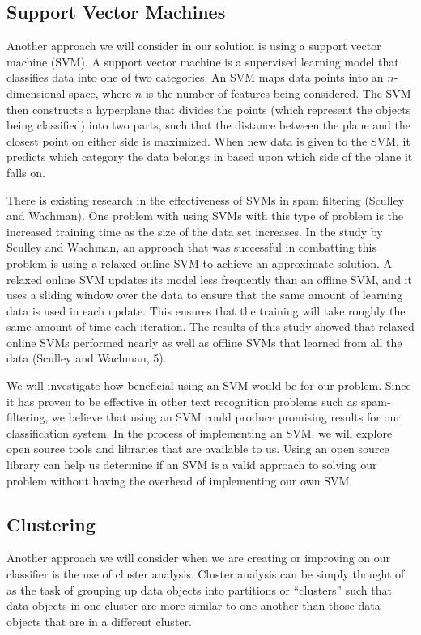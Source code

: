 \documentclass[cs,proposal]{hmcclinic}
\begin{document}
\subsection{Support Vector Machines}

Another approach we will consider in our solution is using a support vector machine (SVM). A support vector machine is a supervised learning model that classifies data into one of two categories. An SVM maps data points into an $n$-dimensional space, where $n$ is the number of features being considered. The SVM then constructs a hyperplane that divides the points (which represent the objects being classified) into two parts, such that the distance between the plane and the closest point on either side is maximized. When new data is given to the SVM, it predicts which category the data belongs in based upon which side of the plane it falls on.

There is existing research in the effectiveness of SVMs in spam filtering (Sculley and Wachman). One problem with using SVMs with this type of problem is the increased training time as the size of the data set increases. In the study by Sculley and Wachman, an approach that was successful in combatting this problem is using a relaxed online SVM to achieve an approximate solution. A relaxed online SVM updates its model less frequently than an offline SVM, and it uses a sliding window over the data to ensure that the same amount of learning data is used in each update. This ensures that the training will take roughly the same amount of time each iteration. The results of this study showed that relaxed online SVMs performed nearly as well as offline SVMs that learned from all the data (Sculley and Wachman, 5).

We will investigate how beneficial using an SVM would be for our problem. Since it has proven to be effective in other text recognition problems such as spam-filtering, we believe that using an SVM could produce promising results for our classification system. In the process of implementing an SVM, we will explore open source tools and libraries that are available to us. Using an open source library can help us determine if an SVM is a valid approach to solving our problem without having the overhead of implementing our own SVM. 

\subsection{Clustering}

Another approach we will consider when we are creating or improving on our classifier is the use of cluster analysis. Cluster analysis can be simply thought of as the task of grouping up data objects into partitions or ``clusters'' such that data objects in one cluster are more similar to one another than those data objects that are in a different cluster.
\end{document}
